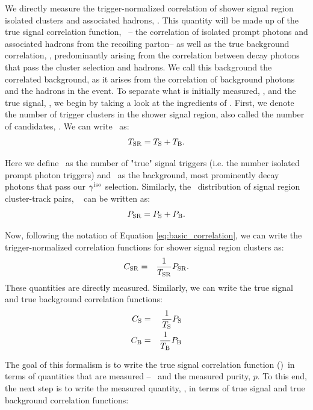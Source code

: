 We directly measure the trigger-normalized correlation of shower signal region isolated clusters and associated hadrons, \CSR. This quantity will be made up of the true signal correlation function, \CS~-- the correlation of isolated prompt photons and associated hadrons from the recoiling parton-- as well as the true background correlation, \CB, predominantly arising from the correlation between decay photons that pass the cluster selection and hadrons. We call this background the correlated background, as it arises from the correlation of background photons and the hadrons in the event. To separate what is initially measured, \CSR, and the true signal, \CS, we begin by taking a look at the ingredients of \CSR. First, we denote the number of trigger clusters in the shower signal region, also called the number of \gammaiso candidates, \TSR. We can write \TSR~as:
\begin{equation}
\label{eq:TS_TB}
T_{\mathrm{SR}} = T_{\mathrm{S}} + T_{\mathrm{B}}.
\end{equation}

Here we define \TS~as the number of "true" signal triggers (i.e. the number isolated prompt photon triggers) and \TB~as the background, most prominently decay photons that pass our $\gamma^\mathrm{iso}$ selection. Similarly, the \deltaphi~distribution of signal region cluster-track pairs, \PSR~ can be written as:
\begin{equation}
\label{eq:PS_PB}
P_{\mathrm{SR}} = P_{\mathrm{S}} + P_{\mathrm{B}}.
\end{equation}

Now, following the notation of Equation \ref{eq:basic_correlation}, we can write the  trigger-normalized correlation functions for shower signal region clusters as:
\begin{eqnarray}
\label{eq:CSR}
C_{\mathrm{SR}} &=& \frac{1}{T_{\mathrm{SR}}}P_{\mathrm{SR}}.
\end{eqnarray}
These quantities are directly measured. Similarly, we can write the true signal and true background correlation functions:
\begin{eqnarray}
C_{\mathrm{S}} &=& \frac{1}{T_{\mathrm{S}}}P_{\mathrm{S}}\\\label{eq:CS}
C_{\mathrm{B}} &=& \frac{1}{T_{\mathrm{B}}}P_{\mathrm{B}}\label{eq:CB}
\end{eqnarray}

The goal of this formalism is to write the true signal correlation function (\CS)~in terms of quantities that are measured --  \CSR~and the measured purity, $p$. To this end, the next step is to write the measured quantity, \CSR, in terms of true signal and true background correlation functions:
 
